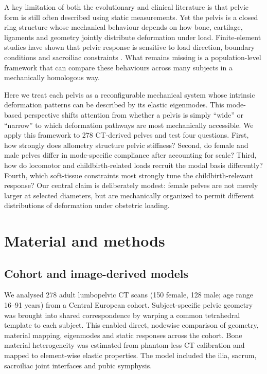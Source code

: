 \documentclass[fleqn,usenatbib]{rsproca_new}
\begin{document}
A key limitation of both the evolutionary and clinical literature is that pelvic form is still often described using static measurements. Yet the pelvis is a closed ring structure whose mechanical behaviour depends on how bone, cartilage, ligaments and geometry jointly distribute deformation under load. Finite-element studies have shown that pelvic response is sensitive to load direction, boundary conditions and sacroiliac constraints \citep{eichenseer2011,hammer2013,toyohara2020}. What remains missing is a population-level framework that can compare these behaviours across many subjects in a mechanically homologous way.

Here we treat each pelvis as a reconfigurable mechanical system whose intrinsic deformation patterns can be described by its elastic eigenmodes. This mode-based perspective shifts attention from whether a pelvis is simply ``wide'' or ``narrow'' to which deformation pathways are most mechanically accessible. We apply this framework to 278 CT-derived pelves and test four questions. First, how strongly does allometry structure pelvic stiffness? Second, do female and male pelves differ in mode-specific compliance after accounting for scale? Third, how do locomotor and childbirth-related loads recruit the modal basis differently? Fourth, which soft-tissue constraints most strongly tune the childbirth-relevant response? Our central claim is deliberately modest: female pelves are not merely larger at selected diameters, but are mechanically organized to permit different distributions of deformation under obstetric loading.

\section{Material and methods}
\subsection{Cohort and image-derived models}
We analysed 278 adult lumbopelvic CT scans (150 female, 128 male; age range 16--91 years) from a Central European cohort. Subject-specific pelvic geometry was brought into shared correspondence by warping a common tetrahedral template to each subject. This enabled direct, nodewise comparison of geometry, material mapping, eigenmodes and static responses across the cohort. Bone material heterogeneity was estimated from phantom-less CT calibration and mapped to element-wise elastic properties. The model included the ilia, sacrum, sacroiliac joint interfaces and pubic symphysis.
\end{document}
